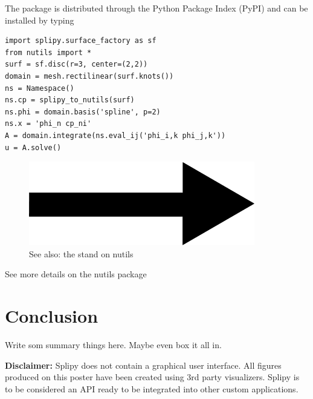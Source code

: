 \documentclass[landscape]{sintefposter}
\begin{document}
\begin{multicols}{3}
\begin{tcolorbox}[colback=white,colframe=sintefblue,title=Integration with Nutils]
  The package is distributed through the Python Package Index (PyPI) and can be installed by typing
  \begin{tcolorbox}[colback=sinteflightgrey]
  \begin{verbatim}
import splipy.surface_factory as sf
from nutils import *
surf = sf.disc(r=3, center=(2,2))
domain = mesh.rectilinear(surf.knots())
ns = Namespace()
ns.cp = splipy_to_nutils(surf)
ns.phi = domain.basis('spline', p=2)
ns.x = 'phi_n cp_ni'
A = domain.integrate(ns.eval_ij('phi_i,k phi_j,k'))
u = A.solve() \end{verbatim}
  \end{tcolorbox}
  \begin{figure}
    \begin{center}
      \includegraphics[width=0.4\linewidth]{right.png} \\
      See also: the stand on nutils
    \end{center}
  \end{figure}
\end{tcolorbox}
See more details on the nutils package


\section{Conclusion}

Write som summary things here.
Maybe even box it all in.

{\small \textbf{Disclaimer:}
Splipy does not contain a graphical user interface.
All figures produced on this poster have been created using 3rd party visualizers.
Splipy is to be considered an API ready to be integrated into other custom applications.
}

\end{multicols}
\end{document}
